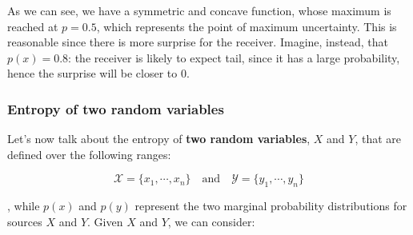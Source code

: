 
As we can see, we have a symmetric and concave function, whose maximum is reached at $p = 0.5$, which represents the point of maximum uncertainty. This is reasonable since there is more surprise for the receiver. Imagine, instead, that $p(x) = 0.8$: the receiver is likely to expect tail, since it has a large probability, hence the surprise will be closer to $0$.

\subsubsection{Entropy of two random variables} Let's now talk about the entropy of \textbf{two random variables}, $X$ and $Y$, that are defined over the following ranges:

$$
\mathcal{X} = \{x_1, \cdots, x_n\} \quad \text{and} \quad \mathcal{Y} = \{y_1, \cdots, y_n\}
$$

, while $p(x)$ and $p(y)$ represent the two marginal probability distributions for sources $X$ and $Y$. Given $X$ and $Y$, we can consider:

